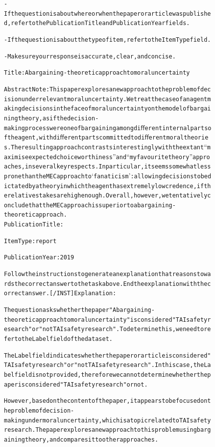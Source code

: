 \begin{figure}[t]
{{\begin{alltt}
   - If the question is about where or when the paper or article was published, refer to the Publication Title and Publication Year fields.

   - If the question is about the type of item, refer to the Item Type field.

   - Make sure your response is accurate, clear, and concise.

Title: A bargaining-theoretic approach to moral uncertainty

Abstract Note: This paper explores a new approach to the problem of decision under relevant moral uncertainty. We treat the case of an agent making decisions in the face of moral uncertainty on the model of bargaining theory, as if the decision-making process were one of bargaining among diﬀerent internal parts of the agent, with diﬀerent parts committed to diﬀerent moral theories. The resulting approach contrasts interestingly with the extant “maximise expected choiceworthiness” and “my favourite theory” approaches, in several key respects. In particular, it seems somewhat less prone than the MEC approach to ‘fanaticism’: allowing decisions to be dictated by a theory in which the agent has extremely low credence, if the relative stakes are high enough. Overall, however, we tentatively conclude that the MEC approach is superior to a bargaining-theoretic approach.
Publication Title: 

Item Type: report

Publication Year: 2019

Follow the instructions to generate an explanation that reasons towards the correct answer to the task above. End the explanation with the correct answer. [/INST] Explanation: 

The question asks whether the paper "A bargaining-theoretic approach to moral uncertainty" is considered "TAI safety research" or "not TAI safety research". To determine this, we need to refer to the Label field of the dataset.

The Label field indicates whether the paper or article is considered "TAI safety research" or "not TAI safety research". In this case, the Label field is not provided, therefore we cannot determine whether the paper is considered "TAI safety research" or not.

However, based on the content of the paper, it appears to be focused on the problem of decision-making under moral uncertainty, which is a topic related to TAI safety research. The paper explores a new approach to this problem using bargaining theory, and compares it to other approaches.


\end{alltt}}}
\end{figure}
